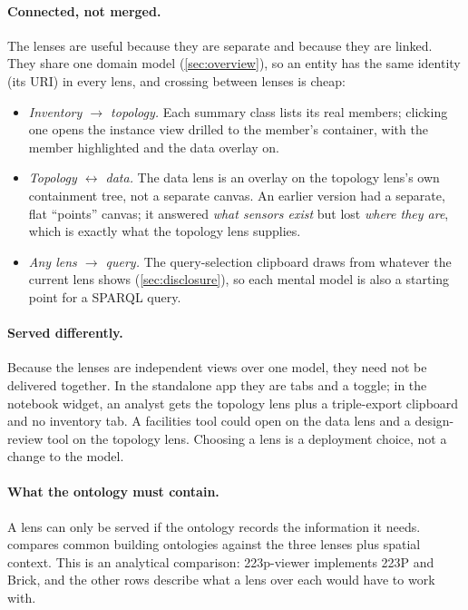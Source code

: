 \documentclass[10pt,twocolumn]{article}
\begin{document}
\paragraph{Connected, not merged.}
The lenses are useful because they are separate and because they are linked. They
share one domain model (\cref{sec:overview}), so an entity has the same identity
(its URI) in every lens, and crossing between lenses is cheap:
\begin{itemize}[leftmargin=*,itemsep=1pt]
  \item \emph{Inventory $\to$ topology.} Each summary class lists its real
  members; clicking one opens the instance view drilled to the member's
  container, with the member highlighted and the data overlay on.
  \item \emph{Topology $\leftrightarrow$ data.} The data lens is an overlay on the
  topology lens's own containment tree, not a separate canvas. An earlier version
  had a separate, flat ``points'' canvas; it answered \emph{what sensors exist}
  but lost \emph{where they are}, which is exactly what the topology lens supplies.
  \item \emph{Any lens $\to$ query.} The query-selection clipboard draws from
  whatever the current lens shows (\cref{sec:disclosure}), so each mental model
  is also a starting point for a SPARQL query.
\end{itemize}

\paragraph{Served differently.}
Because the lenses are independent views over one model, they need not be
delivered together. In the standalone app they are tabs and a toggle; in the
notebook widget, an analyst gets the topology lens plus a triple-export clipboard
and no inventory tab. A facilities tool could open on the data lens and a
design-review tool on the topology lens. Choosing a lens is a deployment choice,
not a change to the model.

\paragraph{What the ontology must contain.}
A lens can only be served if the ontology records the information it needs.
 compares common building ontologies against the three lenses
plus spatial context. This is an analytical comparison: 223p-viewer implements
223P and Brick, and the other rows describe what a lens over each would have to
work with.
\end{document}
